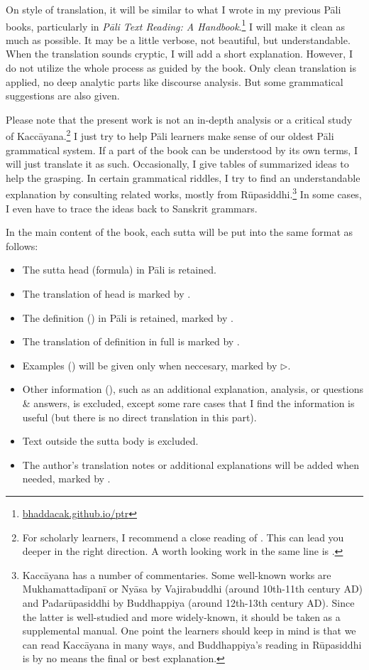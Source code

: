 On style of translation, it will be similar to what I wrote in my previous Pāli books, particularly in \emph{Pāli Text Reading: A Handbook}.\footnote{\url{bhaddacak.github.io/ptr}} I will make it clean as much as possible. It may be a little verbose, not beautiful, but understandable. When the translation sounds cryptic, I will add a short explanation. However, I do not utilize the whole process as guided by the book. Only clean translation is applied, no deep analytic parts like discourse analysis. But some grammatical suggestions are also given.

Please note that the present work is not an in-depth analysis or a critical study of Kaccāyana.\footnote{For scholarly learners, I recommend a close reading of \citealp{pind:survey}. This can lead you deeper in the right direction. A worth looking work in the same line is \citealp{deokar:terms}.} I just try to help Pāli learners make sense of our oldest Pāli grammatical system. If a part of the book can be understood by its own terms, I will just translate it as such. Occasionally, I give tables of summarized ideas to help the grasping. In certain grammatical riddles, I try to find an understandable explanation by consulting related works, mostly from Rūpasiddhi.\footnote{Kaccāyana has a number of commentaries. Some well-known works are Mukhamattadīpanī or Nyāsa by Vajirabuddhi (around 10th-11th century AD) and Padarūpasiddhi by Buddhappiya (around 12th-13th century AD). Since the latter is well-studied and more widely-known, it should be taken as a supplemental manual. One point the learners should keep in mind is that we can read Kaccāyana in many ways, and Buddhappiya's reading in Rūpasiddhi is by no means the final or best explanation.} In some cases, I even have to trace the ideas back to Sanskrit grammars.

In the main content of the book, each sutta will be put into the same format as follows:

\begin{itemize}
\item The sutta head (formula) in Pāli is retained.
\item The translation of head is marked by \faHeart[regular].
\item The definition () in Pāli is retained, marked by \faAngleRight.
\item The translation of definition in full is marked by \faAngleDoubleRight.
\item Examples () will be given only when neccesary, marked by $\triangleright$.
\item Other information (), such as an additional explanation, analysis, or questions \& answers, is excluded, except some rare cases that I find the information is useful (but there is no direct translation in this part).
\item Text outside the sutta body is excluded.
\item The author's translation notes or additional explanations will be added when needed, marked by \faLightbulb[regular].
\end{itemize}

